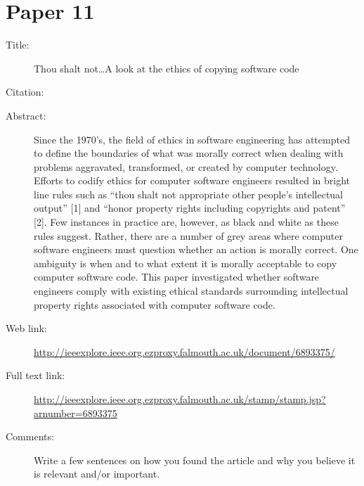 \documentclass{scrartcl}
\begin{document}
\section*{Paper 11}
\begin{description}
\item[Title:] Thou shalt not…A look at the ethics of copying software code
\item[Citation:] \cite{ThouShaltNot}
\item[Abstract:] Since the 1970's, the field of ethics in software engineering has attempted to define the boundaries of what was morally correct when dealing with problems aggravated, transformed, or created by computer technology. Efforts to codify ethics for computer software engineers resulted in bright line rules such as “thou shalt not appropriate other people's intellectual output” [1] and “honor property rights including copyrights and patent” [2]. Few instances in practice are, however, as black and white as these rules suggest. Rather, there are a number of grey areas where computer software engineers must question whether an action is morally correct. One ambiguity is when and to what extent it is morally acceptable to copy computer software code. This paper investigated whether software engineers comply with existing ethical standards surrounding intellectual property rights associated with computer software code.
\item[Web link:] \url{http://ieeexplore.ieee.org.ezproxy.falmouth.ac.uk/document/6893375/}
\item[Full text link:] \url{http://ieeexplore.ieee.org.ezproxy.falmouth.ac.uk/stamp/stamp.jsp?arnumber=6893375}
\item[Comments:] Write a few sentences on how you found the article and why you believe it is relevant and/or important.
\end{description}
\end{document}
